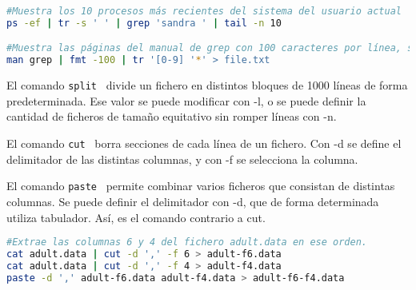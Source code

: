 \begin{lstlisting}[language=bash]
#Muestra los 10 procesos más recientes del sistema del usuario actual
ps -ef | tr -s ' ' | grep 'sandra ' | tail -n 10

#Muestra las páginas del manual de grep con 100 caracteres por línea, sustituyendo los dígitos por asteriscos y redireccionando a un fichero
man grep | fmt -100 | tr '[0-9] '*' > file.txt
\end{lstlisting}

El comando \texttt{split}  \  divide un fichero en distintos bloques de 1000 líneas de forma predeterminada. Ese valor se puede modificar con -l, o se puede definir la cantidad de ficheros de tamaño equitativo sin romper líneas con -n.

El comando \texttt{cut}  \ borra secciones de cada línea de un fichero. Con -d se define el delimitador de las distintas columnas, y con -f se selecciona la columna.

El comando \texttt{paste}  \ permite combinar varios ficheros que consistan de distintas columnas. Se puede definir el delimitador con -d, que de forma determinada utiliza tabulador. Así, es el comando contrario a cut. 

\begin{lstlisting}[language=bash]
#Extrae las columnas 6 y 4 del fichero adult.data en ese orden.
cat adult.data | cut -d ',' -f 6 > adult-f6.data
cat adult.data | cut -d ',' -f 4 > adult-f4.data
paste -d ',' adult-f6.data adult-f4.data > adult-f6-f4.data
\end{lstlisting}